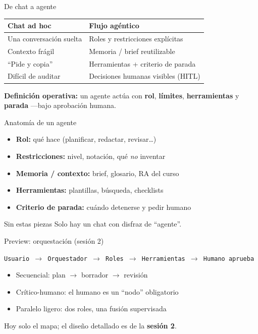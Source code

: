 \documentclass[aspectratio=169,11pt]{beamer}
\begin{document}
\begin{frame}{De chat a agente}
\begin{tabularx}{\textwidth}{@{}XX@{}}
\toprule
\textbf{Chat ad hoc} & \textbf{Flujo agéntico} \\
\midrule
Una conversación suelta & Roles y restricciones explícitas \\
Contexto frágil & Memoria / brief reutilizable \\
``Pide y copia'' & Herramientas + criterio de parada \\
Difícil de auditar & Decisiones humanas visibles (HITL) \\
\bottomrule
\end{tabularx}
\vspace{1em}
\textbf{Definición operativa:} un agente actúa con \textbf{rol}, \textbf{límites}, \textbf{herramientas} y \textbf{parada} ---bajo aprobación humana.
\end{frame}

\begin{frame}{Anatomía de un agente}
\begin{itemize}
\item \textbf{Rol:} qué hace (planificar, redactar, revisar\ldots)
\item \textbf{Restricciones:} nivel, notación, qué \emph{no} inventar
\item \textbf{Memoria / contexto:} brief, glosario, RA del curso
\item \textbf{Herramientas:} plantillas, búsqueda, checklists
\item \textbf{Criterio de parada:} cuándo detenerse y pedir humano
\end{itemize}
\begin{alertblock}{Sin estas piezas}
Solo hay un chat con disfraz de ``agente''.
\end{alertblock}
\end{frame}

\begin{frame}{Preview: orquestación (sesión 2)}
\begin{center}
\texttt{Usuario $\rightarrow$ Orquestador $\rightarrow$ Roles $\rightarrow$ Herramientas $\rightarrow$ Humano aprueba}
\end{center}
\begin{itemize}
\item Secuencial: plan $\rightarrow$ borrador $\rightarrow$ revisión
\item Crítico-humano: el humano es un ``nodo'' obligatorio
\item Paralelo ligero: dos roles, una fusión supervisada
\end{itemize}
Hoy solo el mapa; el diseño detallado es de la \textbf{sesión 2}.
\end{frame}
\end{document}
